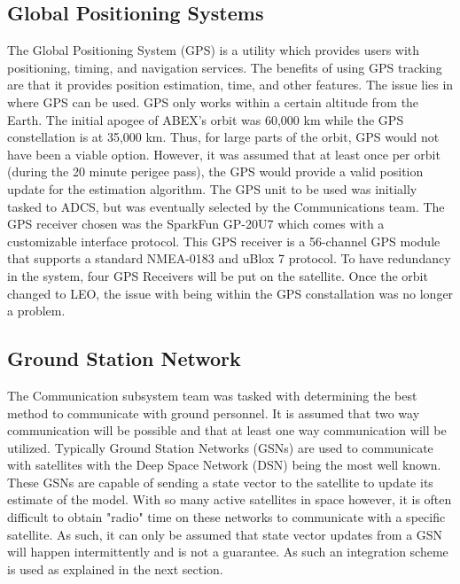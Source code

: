 \documentclass[conf]{new-aiaa}
\begin{document}
\subsection{Global Positioning Systems}
The Global Positioning System (GPS) is a utility which provides users with positioning, timing, and navigation services. The benefits of using GPS tracking are that it provides position estimation,  time, and other features. The issue lies in where GPS can be used. GPS only works within a certain altitude from the Earth. The initial apogee of ABEX's orbit was 60,000 km while the GPS constellation is at 35,000 km. Thus, for large parts of the orbit, GPS would not have been a viable option. However, it was assumed that at least once per orbit (during the 20 minute perigee pass), the GPS would provide a valid position update for the estimation algorithm. The GPS unit to be used was initially tasked to ADCS, but was eventually selected by the Communications team. The GPS receiver chosen was the SparkFun GP-20U7 which comes with a customizable interface protocol. This GPS receiver is a 56-channel GPS module that supports a standard NMEA-0183 and uBlox 7 protocol. To have redundancy in the system, four GPS Receivers will be put on the satellite. Once the orbit changed to LEO, the issue with being within the GPS constallation was no longer a problem.

\subsection{Ground Station Network}
The Communication subsystem team was tasked with determining the best method to communicate with ground personnel. It is assumed that two way communication will be possible and that at least one way communication will be utilized. Typically Ground Station Networks (GSNs) are used to communicate with satellites with the Deep Space Network (DSN) being the most well known. These GSNs are capable of sending a state vector to the satellite to update its estimate of the model. With so many active satellites in space however, it is often difficult to obtain "radio" time on these networks to communicate with a specific satellite. As such, it can only be assumed that state vector updates from a GSN will happen intermittently and is not a guarantee. As such an integration scheme is used as explained in the next section.
\end{document}
